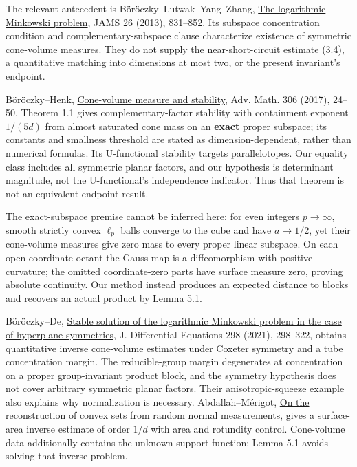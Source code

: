 \documentclass[
  11pt,
]{article}
\begin{document}
The relevant antecedent is Böröczky--Lutwak--Yang--Zhang,
\href{https://www.renyi.hu/~carlos/minkowski0-prob.pdf}{The logarithmic
Minkowski problem}, JAMS 26 (2013), 831--852. Its subspace concentration
condition and complementary-subspace clause characterize existence of
symmetric cone-volume measures. They do not supply the
near-short-circuit estimate (3.4), a quantitative matching into
dimensions at most two, or the present invariant's endpoint.

Böröczky--Henk,
\href{https://www.renyi.hu/~carlos/cone-volume-stability.pdf}{Cone-volume
measure and stability}, Adv. Math. 306 (2017), 24--50, Theorem 1.1 gives
complementary-factor stability with containment exponent \(1/(5d)\) from
almost saturated cone mass on an \textbf{exact} proper subspace; its
constants and smallness threshold are stated as dimension-dependent,
rather than numerical formulas. Its U-functional stability targets
parallelotopes. Our equality class includes all symmetric planar
factors, and our hypothesis is determinant magnitude, not the
U-functional's independence indicator. Thus that theorem is not an
equivalent endpoint result.

The exact-subspace premise cannot be inferred here: for even integers
\(p\to\infty\), smooth strictly convex \(\ell_p\) balls converge to the
cube and have \(a\to1/2\), yet their cone-volume measures give zero mass
to every proper linear subspace. On each open coordinate octant the
Gauss map is a diffeomorphism with positive curvature; the omitted
coordinate-zero parts have surface measure zero, proving absolute
continuity. Our method instead produces an expected distance to blocks
and recovers an actual product by Lemma 5.1.

Böröczky--De, \href{https://arxiv.org/abs/2101.03395}{Stable solution of
the logarithmic Minkowski problem in the case of hyperplane symmetries},
J. Differential Equations 298 (2021), 298--322, obtains quantitative
inverse cone-volume estimates under Coxeter symmetry and a tube
concentration margin. The reducible-group margin degenerates at
concentration on a proper group-invariant product block, and the
symmetry hypothesis does not cover arbitrary symmetric planar factors.
Their anisotropic-squeeze example also explains why normalization is
necessary. Abdallah--Mérigot, \href{https://arxiv.org/abs/1402.5010}{On
the reconstruction of convex sets from random normal measurements},
gives a surface-area inverse estimate of order \(1/d\) with area and
rotundity control. Cone-volume data additionally contains the unknown
support function; Lemma 5.1 avoids solving that inverse problem.
\end{document}
